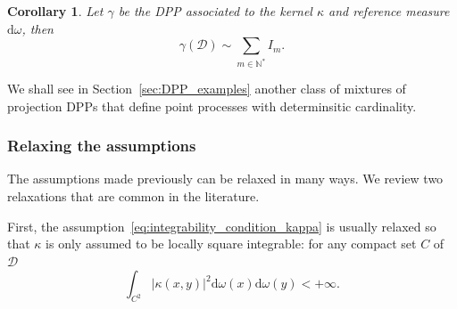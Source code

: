 \documentclass[twoside,11pt]{book}
\newtheorem{corollary}{Corollary}
\newtheorem{example}{Example}
\numberwithin{theorem}{chapter}
\numberwithin{definition}{chapter}
\numberwithin{proposition}{chapter}
\numberwithin{corollary}{chapter}
\numberwithin{example}{chapter}
\numberwithin{lemma}{chapter}
\numberwithin{assumption}{chapter}
\begin{document}
\begin{corollary}

Let $\gamma$ be the DPP associated to the kernel $\kappa$ and reference measure $\mathrm{d}\omega$,
then 
\begin{equation}
\gamma(\mathcal{D}) \sim \sum\limits_{m \in \mathbb{N}^{*}} I_{m}.
\end{equation}
\end{corollary}
We shall see in Section~\ref{sec:DPP_examples} another class of mixtures of projection DPPs that define point processes with determinsitic cardinality.






\subsubsection{Relaxing the assumptions}



The assumptions made previously can be relaxed in many ways. We review two relaxations that are common in the literature.

First, the assumption~\eqref{eq:integrability_condition_kappa} is usually relaxed so that $\kappa$ is only assumed to be locally square integrable: for any compact set $C$ of $\mathcal{D}$
\begin{equation}
\int_{C^{2}} |\kappa(x,y)|^{2} \mathrm{d}\omega(x) \mathrm{d}\omega(y) < +\infty.
\end{equation}
\end{document}
